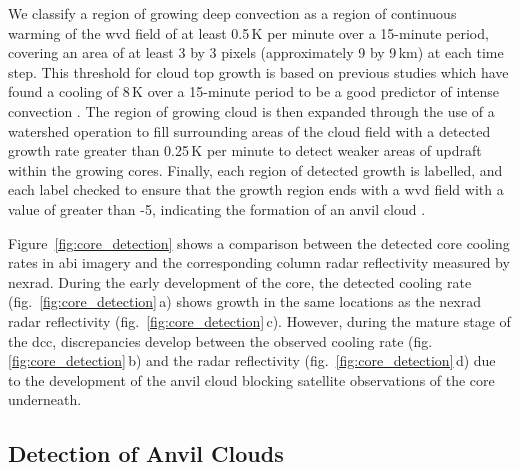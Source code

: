 We classify a region of growing deep convection as a region of continuous warming of the \acrshort{wvd} field of at least 0.5\,\unit{K} per minute over a 15-minute period, covering an area of at least 3 by 3 pixels (approximately 9 by 9\,\unit{km}) at each time step.
This threshold for cloud top growth is based on previous studies which have found a cooling of 8\,\unit{K} over a 15-minute period to be a good predictor of intense convection \citep{roberts_nowcasting_2003, hartung_intercomparison_2013}.
The region of growing cloud is then expanded through the use of a watershed operation to fill surrounding areas of the cloud field with a detected growth rate greater than 0.25\,\unit{K} per minute to detect weaker areas of updraft within the growing cores.
Finally, each region of detected growth is labelled, and each label checked to ensure that the growth region ends with a \acrshort{wvd} field with a value of greater than -5, indicating the formation of an anvil cloud \citep{muller_role_2018}.

Figure~\ref{fig:core_detection} shows a comparison between the detected core cooling rates in \acrshort{abi} imagery and the corresponding column radar reflectivity measured by \acrshort{nexrad}. 
During the early development of the core, the detected cooling rate (fig.~\ref{fig:core_detection}\,a) shows growth in the same locations as the \acrshort{nexrad} radar reflectivity (fig.~\ref{fig:core_detection}\,c).
However, during the mature stage of the \acrshort{dcc}, discrepancies develop between the observed cooling rate (fig.\ref{fig:core_detection}\,b) and the radar reflectivity (fig.~\ref{fig:core_detection}\,d) due to the development of the anvil cloud blocking satellite observations of the core underneath.

\subsection{Detection of Anvil Clouds}

